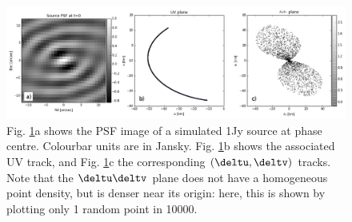 \begin{figure}[!t]
\centering
\includegraphics[width=\textwidth]{images/psfIM-dudv-labelled.png}
\caption{\label{plot.psf.uv.dudv} Fig. \ref{plot.psf.uv.dudv}a shows the PSF image of a simulated 1Jy source at phase centre. {Colourbar units are in Jansky}.  Fig. \ref{plot.psf.uv.dudv}b shows the associated UV track, and Fig. \ref{plot.psf.uv.dudv}c the corresponding $\left(\deltu,\deltv\right)$ tracks. Note that the $\deltu\deltv$ plane does not have a homogeneous point density, but is denser near its origin: here, this is shown by plotting only 1 random point in 10000.}
\end{figure}

